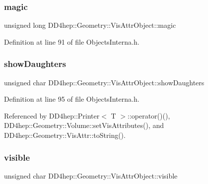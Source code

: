 \hypertarget{class_d_d4hep_1_1_geometry_1_1_vis_attr_object_ab8370d8a18bf092a48bde486479bbdff}{}\label{class_d_d4hep_1_1_geometry_1_1_vis_attr_object_ab8370d8a18bf092a48bde486479bbdff} 
\subsubsection{\texorpdfstring{magic}{magic}}
{\footnotesize\ttfamily unsigned long D\+D4hep\+::\+Geometry\+::\+Vis\+Attr\+Object\+::magic}



Definition at line 91 of file Objects\+Interna.\+h.

\hypertarget{class_d_d4hep_1_1_geometry_1_1_vis_attr_object_a7fc2c6d4195f0c8524315272a81436e6}{}\label{class_d_d4hep_1_1_geometry_1_1_vis_attr_object_a7fc2c6d4195f0c8524315272a81436e6} 
\subsubsection{\texorpdfstring{show\+Daughters}{showDaughters}}
{\footnotesize\ttfamily unsigned char D\+D4hep\+::\+Geometry\+::\+Vis\+Attr\+Object\+::show\+Daughters}



Definition at line 95 of file Objects\+Interna.\+h.



Referenced by D\+D4hep\+::\+Printer$<$ T $>$\+::operator()(), D\+D4hep\+::\+Geometry\+::\+Volume\+::set\+Vis\+Attributes(), and D\+D4hep\+::\+Geometry\+::\+Vis\+Attr\+::to\+String().

\hypertarget{class_d_d4hep_1_1_geometry_1_1_vis_attr_object_a316d66f51e43f6601839b271072a4765}{}\label{class_d_d4hep_1_1_geometry_1_1_vis_attr_object_a316d66f51e43f6601839b271072a4765} 
\subsubsection{\texorpdfstring{visible}{visible}}
{\footnotesize\ttfamily unsigned char D\+D4hep\+::\+Geometry\+::\+Vis\+Attr\+Object\+::visible}



